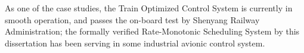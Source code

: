 \begin{eabstract}
As one of the case studies, the Train Optimized Control System is currently in smooth operation, and passes the on-board test by Shenyang Railway Administration; the formally verified Rate-Monotonic Scheduling System by this dissertation has been serving in some industrial avionic control system.
\end{eabstract}

